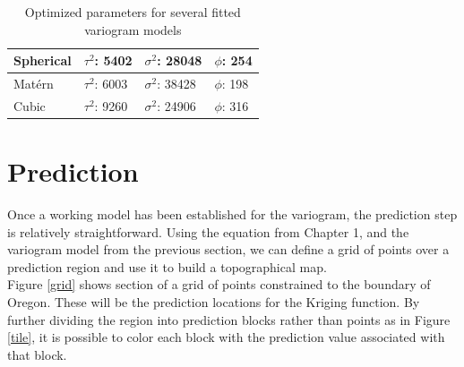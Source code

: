 \documentclass[12pt,twoside]{reedthesis}
\begin{document}
	  
	
	
	   
	  
	
	
\begin{table}[h]

\centering

\begin{tabular}{l|l|l|l}

\hline

 Spherical & $\tau^2$: 5402 & $\sigma^2$: 28048  & $\phi$: 254 \\
 
 \hline
 
 
Mat\'ern & $\tau^2$: 6003 & $\sigma^2$: 38428  & $\phi$: 198 \\

 \hline
 
 Cubic & $\tau^2$: 9260 & $\sigma^2$: 24906  & $\phi$: 316 \\
 \hline
 
 \end{tabular}
 
 \caption{Optimized parameters for several fitted variogram models}
 \label{param}
 
 \end{table}
 
 \section{Prediction}
 
 Once a working model has been established for the variogram, the prediction step is relatively straightforward. Using the equation from Chapter 1, and the variogram model from the previous section, we can define a grid of points over a prediction region and use it to build a topographical map. \\
 
 Figure \ref{grid} shows section of a grid of points constrained to the boundary of Oregon. These will be the prediction locations for the Kriging function. By further dividing the region into prediction blocks rather than points as in Figure \ref{tile}, it is possible to color each block with the prediction value associated with that block. 
 
\end{document}
